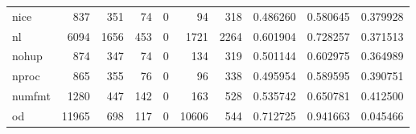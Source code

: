 \begin{longtable}{lrrrrrrrrr}
nice      &                                 837 &                                             351 &                                             74 &                                             0 &                                             94 &                                          318 &                                           0.486260 &                               0.580645 &                             0.379928 \\
nl        &                                6094 &                                            1656 &                                            453 &                                             0 &                                           1721 &                                         2264 &                                           0.601904 &                               0.728257 &                             0.371513 \\
nohup     &                                 874 &                                             347 &                                             74 &                                             0 &                                            134 &                                          319 &                                           0.501144 &                               0.602975 &                             0.364989 \\
nproc     &                                 865 &                                             355 &                                             76 &                                             0 &                                             96 &                                          338 &                                           0.495954 &                               0.589595 &                             0.390751 \\
numfmt    &                                1280 &                                             447 &                                            142 &                                             0 &                                            163 &                                          528 &                                           0.535742 &                               0.650781 &                             0.412500 \\
od        &                               11965 &                                             698 &                                            117 &                                             0 &                                          10606 &                                          544 &                                           0.712725 &                               0.941663 &                             0.045466 \\

\end{longtable}
